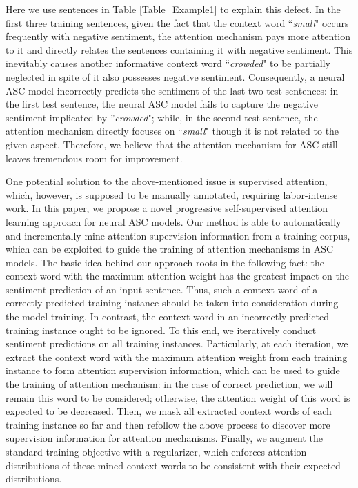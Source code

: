 \documentclass[11pt,a4paper]{article}
\begin{document}
Here we use sentences in Table \ref{Table_Example1} to explain this defect.
In the first three training sentences,
given the fact that the context word ``\emph{small}" occurs frequently with negative sentiment,
the attention mechanism pays more attention to it and directly relates the sentences containing it with negative sentiment.
This inevitably causes another informative context word ``\emph{crowded}" to be partially neglected in spite of it also possesses negative sentiment.
Consequently,
a neural ASC model incorrectly predicts the sentiment of the last two test sentences:
in the first test sentence,
the neural ASC model fails to capture the negative sentiment implicated by ''\emph{crowded}";
while,
in the second test sentence,
the attention mechanism directly focuses on ``\emph{small}"
though it is not related to the given aspect.
Therefore,
we believe that the attention mechanism for ASC still leaves tremendous room for improvement.


One potential solution to the above-mentioned issue is supervised attention,
which,
however,
is supposed to be manually annotated, requiring labor-intense work.
In this paper,
we propose a novel progressive self-supervised attention learning approach for neural ASC models.
Our method is able to automatically and incrementally mine attention supervision information from a training corpus,
which can be exploited to guide the training of attention mechanisms in ASC models.
The basic idea behind our approach roots in the following fact:
the context word with the maximum attention weight has the greatest impact on the sentiment prediction of an input sentence.
Thus, such a context word of a correctly predicted training instance should be taken into consideration during the model training. 
In contrast, 
the context word in an incorrectly predicted training instance ought to be ignored.
To this end,
we iteratively conduct sentiment predictions on all training instances.
Particularly,
at each iteration,
we extract the context word with the maximum attention weight from each training instance to form attention supervision information,
which can be used to guide the training of attention mechanism:
in the case of correct prediction,
we will remain this word to be considered;
otherwise,
the attention weight of this word is expected to be decreased.
Then,
we mask all extracted context words of each training instance so far
and then refollow the above process to discover more 
supervision information for attention mechanisms.
Finally,
we augment the standard training objective with a regularizer,
which enforces attention distributions of these mined context words to be consistent with their expected distributions.
\end{document}
